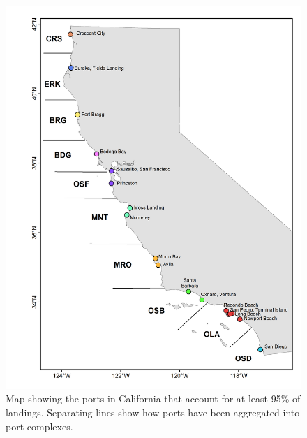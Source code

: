 \documentclass[12pt]{article}
\begin{document}
%
\begin{figure}[h!]
\centering
\includegraphics[width=\textwidth]{./pictures/COMX_Ports_Final.png}
\caption{Map showing the ports in California that account for at least 95\% of 
landings. Separating lines show how ports have been aggregated into port 
complexes.}
\label{portMap}
\end{figure}
\end{document}
